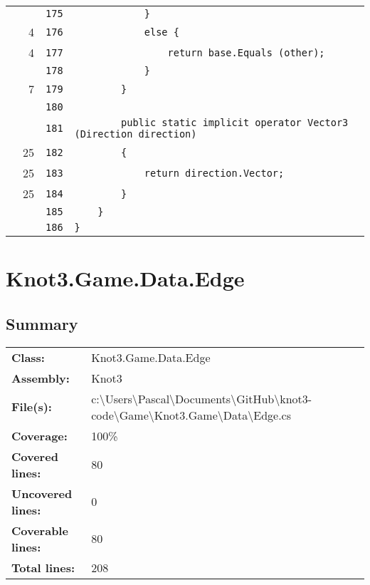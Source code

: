 \documentclass[a4paper,10pt]{article}
\begin{document}
\begin{longtable}[l]{lrrl}
\cellcolor{gray} &  & \verb~175~ & \verb~            }~\\
\cellcolor{green} & 4 & \verb~176~ & \verb~            else {~\\
\cellcolor{green} & 4 & \verb~177~ & \verb~                return base.Equals (other);~\\
\cellcolor{gray} &  & \verb~178~ & \verb~            }~\\
\cellcolor{green} & 7 & \verb~179~ & \verb~        }~\\
\cellcolor{gray} &  & \verb~180~ & \verb~~\\
\cellcolor{gray} &  & \verb~181~ & \verb~        public static implicit operator Vector3 (Direction direction)~\\
\cellcolor{green} & 25 & \verb~182~ & \verb~        {~\\
\cellcolor{green} & 25 & \verb~183~ & \verb~            return direction.Vector;~\\
\cellcolor{green} & 25 & \verb~184~ & \verb~        }~\\
\cellcolor{gray} &  & \verb~185~ & \verb~    }~\\
\cellcolor{gray} &  & \verb~186~ & \verb~}~\\
\end{longtable}
\newpage
\section{Knot3.Game.Data.Edge}
\subsection{Summary}
\begin{longtable}[l]{ll}
\textbf{Class:} & Knot3.Game.Data.Edge\\
\textbf{Assembly:} & Knot3\\
\textbf{File(s):} & \begin{minipage}[t]{12cm}{c:\textbackslash Users\textbackslash Pascal\textbackslash Documents\textbackslash GitHub\textbackslash knot3-code\textbackslash Game\textbackslash Knot3.Game\textbackslash Data\textbackslash Edge.cs}\end{minipage} \\
\textbf{Coverage:} & 100\%\\
\textbf{Covered lines:} & 80\\
\textbf{Uncovered lines:} & 0\\
\textbf{Coverable lines:} & 80\\
\textbf{Total lines:} & 208\\
\end{longtable}
\end{document}
